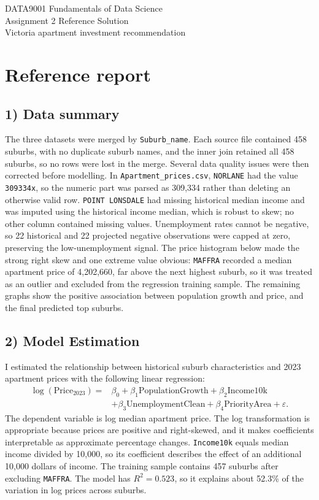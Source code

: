 \documentclass[11pt]{article}
\begin{document}
\begin{center}
{\Large DATA9001 Fundamentals of Data Science}\\[0.3em]
{\large Assignment 2 Reference Solution}\\[0.3em]
{\normalsize Victoria apartment investment recommendation}
\end{center}

\section*{Reference report}

\subsection*{1) Data summary}
The three datasets were merged by \texttt{Suburb\_name}. Each source file contained 458 suburbs, with no duplicate suburb names, and the inner join retained all 458 suburbs, so no rows were lost in the merge. Several data quality issues were then corrected before modelling. In \texttt{Apartment\_prices.csv}, \texttt{NORLANE} had the value \texttt{309334x}, so the numeric part was parsed as 309,334 rather than deleting an otherwise valid row. \texttt{POINT LONSDALE} had missing historical median income and was imputed using the historical income median, which is robust to skew; no other column contained missing values. Unemployment rates cannot be negative, so 22 historical and 22 projected negative observations were capped at zero, preserving the low-unemployment signal. The price histogram below made the strong right skew and one extreme value obvious: \texttt{MAFFRA} recorded a median apartment price of 4,202,660, far above the next highest suburb, so it was treated as an outlier and excluded from the regression training sample. The remaining graphs show the positive association between population growth and price, and the final predicted top suburbs.

\subsection*{2) Model Estimation}
I estimated the relationship between historical suburb characteristics and 2023 apartment prices with the following linear regression:
\[
\begin{aligned}
\log(\text{Price}_{2023})=&
\beta_0+\beta_1\text{PopulationGrowth}+\beta_2\text{Income10k}\\
&+\beta_3\text{UnemploymentClean}+\beta_4\text{PriorityArea}+\varepsilon.
\end{aligned}
\]
The dependent variable is log median apartment price. The log transformation is appropriate because prices are positive and right-skewed, and it makes coefficients interpretable as approximate percentage changes. \texttt{Income10k} equals median income divided by 10,000, so its coefficient describes the effect of an additional 10,000 dollars of income. The training sample contains 457 suburbs after excluding \texttt{MAFFRA}. The model has \(R^2=0.523\), so it explains about 52.3\% of the variation in log prices across suburbs.
\end{document}

